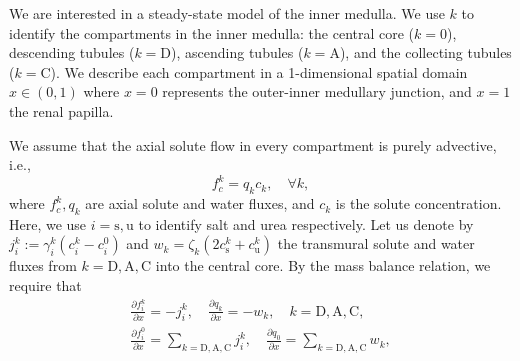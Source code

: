 \documentclass{article}
\begin{document}
We are interested in a steady-state model of the inner medulla.
We use $k$ to identify the compartments in the inner medulla: the central core ($k=0$), descending tubules ($k=\mathrm{D}$), ascending tubules ($k=\mathrm{A}$), and the collecting tubules ($k=\mathrm{C}$).
We describe each compartment in a 1-dimensional spatial domain $x\in (0,1)$ where $x=0$ represents the outer-inner medullary junction, and $x=1$ the renal papilla.

We assume that the axial solute flow in every compartment is purely advective, i.e.,
\begin{equation}
    f_c^k = q_kc_k,\quad \forall k,
\end{equation}
    where $f_c^k,q_k$ are axial solute and water fluxes, and $c_k$ is the solute concentration.
Here, we use $i=\mathrm{s},\mathrm{u}$ to identify salt and urea respectively.
Let us denote by $j_i^k:=\gamma_i^k(c_i^k - c_i^0)$ and $w_k = \zeta_k(2c_\mathrm{s}^k+c_\mathrm{u}^k)$ the transmural solute and water fluxes from $k=\mathrm{D,A,C}$ into the central core.
By the mass balance relation, we require that
\begin{gather}
    \frac{\partial f_i^k}{\partial x} = -j_i^k,\quad \frac{\partial q_k}{\partial x} = -w_k,\quad k=\mathrm{D,A,C},\\
    \frac{\partial f_i^0}{\partial x} = \sum_{k=\mathrm{D,A,C}} j_i^k,\quad \frac{\partial q_0}{\partial x} = \sum_{k=\mathrm{D,A,C}} w_k,
\end{gather}
\end{document}
